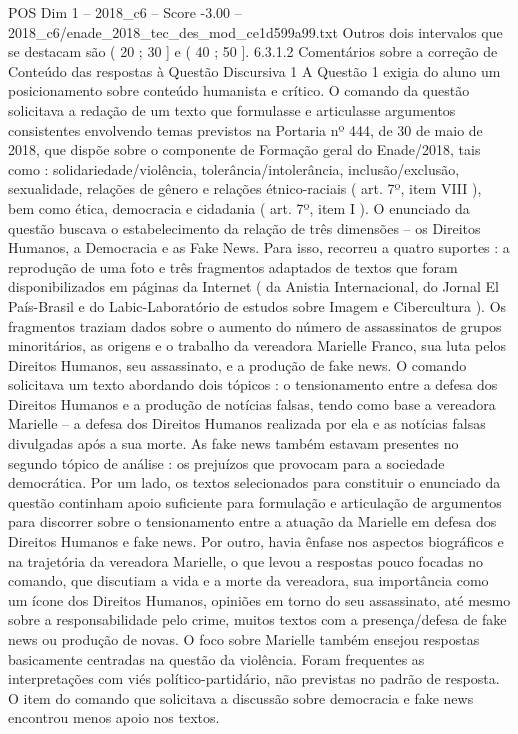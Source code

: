 \begin{textsample}{POS Dim 1 – 2018\_c6 – Score -3.00 – 2018\_c6/enade\_2018\_tec\_des\_mod\_ce1d599a99.txt}
Outros dois intervalos que se destacam são ( 20 ; 30 ] e ( 40 ; 50 ]. 6.3.1.2 Comentários sobre a correção de Conteúdo das respostas à Questão Discursiva 1 A Questão 1 exigia do aluno um posicionamento sobre conteúdo humanista e crítico.
O comando da questão solicitava a redação de um texto que formulasse e articulasse argumentos consistentes envolvendo temas previstos na Portaria nº 444, de 30 de maio de 2018, que dispõe sobre o componente de Formação geral do Enade/2018, tais como : solidariedade/violência, tolerância/intolerância, inclusão/exclusão, sexualidade, relações de gênero e relações étnico-raciais ( art. 7º, item VIII ), bem como ética, democracia e cidadania ( art. 7º, item I ).
O enunciado da questão buscava o estabelecimento da relação de três dimensões – os Direitos Humanos, a Democracia e as Fake News.
Para isso, recorreu a quatro suportes : a reprodução de uma foto e três fragmentos adaptados de textos que foram disponibilizados em páginas da Internet ( da Anistia Internacional, do Jornal El País-Brasil e do Labic-Laboratório de estudos sobre Imagem e Cibercultura ).
Os fragmentos traziam dados sobre o aumento do número de assassinatos de grupos minoritários, as origens e o trabalho da vereadora Marielle Franco, sua luta pelos Direitos Humanos, seu assassinato, e a produção de fake news.
O comando solicitava um texto abordando dois tópicos : o tensionamento entre a defesa dos Direitos Humanos e a produção de notícias falsas, tendo como base a vereadora Marielle – a defesa dos Direitos Humanos realizada por ela e as notícias falsas divulgadas após a sua morte.
As fake news também estavam presentes no segundo tópico de análise : os prejuízos que provocam para a sociedade democrática.
Por um lado, os textos selecionados para constituir o enunciado da questão continham apoio suficiente para formulação e articulação de argumentos para discorrer sobre o tensionamento entre a atuação da Marielle em defesa dos Direitos Humanos e fake news.
Por outro, havia ênfase nos aspectos biográficos e na trajetória da vereadora Marielle, o que levou a respostas pouco focadas no comando, que discutiam a vida e a morte da vereadora, sua importância como um ícone dos Direitos Humanos, opiniões em torno do seu assassinato, até mesmo sobre a responsabilidade pelo crime, muitos textos com a presença/defesa de fake news ou produção de novas.
O foco sobre Marielle também ensejou respostas basicamente centradas na questão da violência.
Foram frequentes as interpretações com viés político-partidário, não previstas no padrão de resposta.
O item do comando que solicitava a discussão sobre democracia e fake news encontrou menos apoio nos textos.

\end{textsample}
